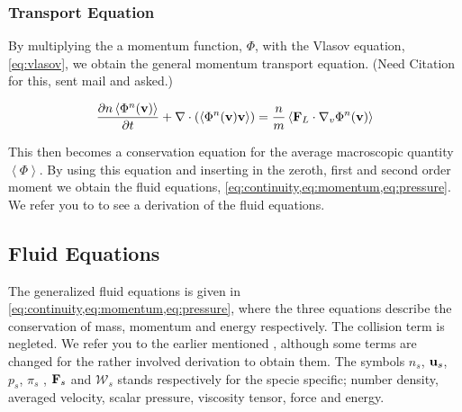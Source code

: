 		\subsubsection{Transport Equation}
		By multiplying the a momentum function, \( \Phi \), with the Vlasov equation, \cref{eq:vlasov},
		we obtain the general momentum transport equation. (Need Citation for this, sent mail and asked.)

		\begin{equation}
			\pdv{n\left< \Phi^n(\vb{v}) \right>}{t} + \nabla \cdot \left( \left< \Phi^n(\vb{v})\vb{v} \right> \right)
			= \frac{n}{m} \left< \vb{F}_L \cdot \nabla_v \Phi^n(\vb{v}) \right>
		\end{equation}

		This then becomes a conservation equation for the average macroscopic quantity
		\(\left< \Phi \right>\). By using this equation and inserting in the zeroth, first and second order
		moment we obtain the fluid equations, \cref{eq:continuity,eq:momentum,eq:pressure}.
		We refer you to  to see a derivation of the fluid
		equations.




\subsection{Fluid Equations}
	\label{sec:fluid}
	The generalized fluid equations is given in \cref{eq:continuity,eq:momentum,eq:pressure}, where the three equations
	describe the conservation of mass, momentum and energy respectively. The collision term is negleted.
	We refer you to the earlier mentioned \textit{}, although some
	terms are changed
	for the rather involved derivation to obtain them.
	The symbols \(n_s\), \(\vb{u}_s\), \(p_s\), \(\pi_s\) , \(\vb{F}_s\) and \(\mathcal{W}_s\) stands respectively for
	the specie specific; number density, averaged velocity, scalar pressure, viscosity tensor, force and energy.

